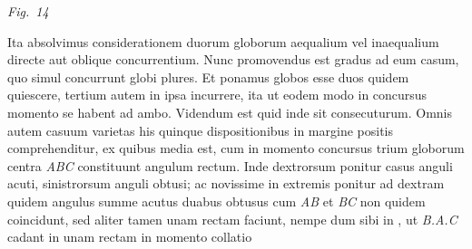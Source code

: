 \vspace{0.5em}
\centerline{%
\lbrack\textit{Fig.~14}\rbrack%
}
\vspace{1.5em}
%
%
\pstart
 Ita absolvimus considerationem duorum globorum aequalium vel inaequalium directe aut oblique concurrentium.%
\protect{} 
%
Nunc promovendus est gradus ad eum casum, quo simul concurrunt globi plures.%
\protect{} Et ponamus  
%
%
globos esse  
%
%
duos quidem quiescere, tertium autem in ipsa incurrere, ita ut eodem modo in  
%
concursus momento\protect{} se habent ad ambo.  
%
Videndum est quid inde sit consecuturum. Omnis autem casuum varietas his quinque dispositionibus  
%
in margine positis comprehenditur, ex quibus media est, 
%
cum in momento %
concursus%
\protect{} trium globorum\protect{} centra \textit{ABC} constituunt angulum rectum.%
\protect{}  
%
Inde dextrorsum ponitur casus anguli acuti\protect{},  
%
sinistrorsum anguli obtusi\protect{}; ac novissime  
%
in extremis ponitur ad dextram quidem angulus summe acutus  
%
 duabus  
%
%
obtusus cum \textit{AB} et \textit{BC} non quidem coincidunt, sed aliter tamen unam rectam faciunt, nempe dum sibi in  
%
, ut \textit{B.A.C} cadant in unam rectam in momento  
%
 collatio  
